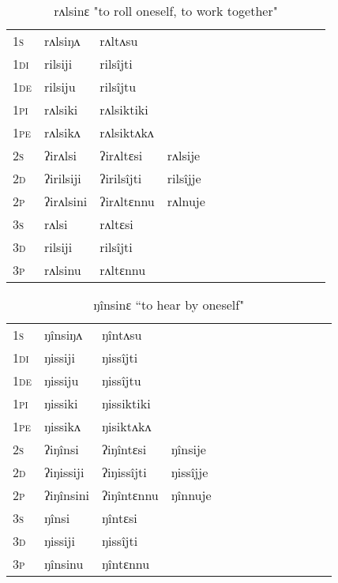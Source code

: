 \documentclass[oldfontcommands,oneside,a4paper,11pt]{article}
\begin{document}
\begin{table}[H]
\label{il.vr} \centering 
\caption{rʌlsinɛ  "to roll oneself, to work together"  }
\begin{tabular}{l|l|l|l|l|l|l|l|l|l|l|l|l}  \toprule
\textsc{1s} &rʌlsiŋʌ &rʌltʌsu \\ 
\textsc{1di} &rilsiji &rilsîjti   \\
\textsc{1de} &rilsiju &rilsîjtu   \\ 
\textsc{1pi} &rʌlsiki &rʌlsiktiki   \\ 
\textsc{1pe} &rʌlsikʌ &rʌlsiktʌkʌ   \\ 
\textsc{2s} & ʔirʌlsi & ʔirʌltɛsi &rʌlsije  \\ 
\textsc{2d} & ʔirilsiji & ʔirilsîjti &rilsîjje    \\
\textsc{2p} & ʔirʌlsini  & ʔirʌltɛnnu &rʌlnuje  \\ 
\textsc{3s} & rʌlsi & rʌltɛsi   \\ 
\textsc{3d} & rilsiji & rilsîjti   \\ 
\textsc{3p} & rʌlsinu  & rʌltɛnnu \\ 
\bottomrule
\end{tabular}
\end{table}


\begin{table}[H]
\label{i.vr} \centering 
\caption{ ŋînsinɛ  ``to hear by oneself"  }
\begin{tabular}{l|l|l|l|l|l|l|l|l|l|l|l|l}  \toprule
\textsc{1s} &ŋînsiŋʌ &ŋîntʌsu \\ 
\textsc{1di} &ŋissiji &ŋissîjti   \\
\textsc{1de} &ŋissiju &ŋissîjtu   \\ 
\textsc{1pi} &ŋissiki &ŋissiktiki   \\ 
\textsc{1pe} &ŋissikʌ &ŋisiktʌkʌ   \\ 
\textsc{2s} & ʔiŋînsi & ʔiŋîntɛsi &ŋînsije  \\ 
\textsc{2d} & ʔiŋissiji & ʔiŋissîjti &ŋissîjje    \\
\textsc{2p} & ʔiŋînsini  & ʔiŋîntɛnnu &ŋînnuje  \\ 
\textsc{3s} & ŋînsi & ŋîntɛsi   \\ 
\textsc{3d} & ŋissiji & ŋissîjti   \\ 
\textsc{3p} & ŋînsinu  & ŋîntɛnnu \\ 
\bottomrule
\end{tabular}
\end{table}
\end{document}
